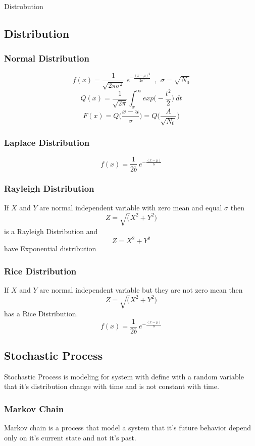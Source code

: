                 Distrobution

\subsection{Distribution}
\subsubsection{Normal Distribution}
\setlength{\abovedisplayshortskip}{7pt}
\setlength{\belowdisplayshortskip}{7pt}
\large$$ f(x) = \frac{1}{\sqrt{2\pi\sigma^2}} ~ e^{-\frac{(x-\mu)^2}{2\sigma^2}} ~~ , ~~ \sigma = \sqrt{N_0}$$
\normalsize
\setlength{\abovedisplayshortskip}{7pt}
\setlength{\belowdisplayshortskip}{7pt}
$$ Q(x) = \frac{1}{\sqrt{2\pi}}\int_x^\infty exp\big(-\frac{t^2}{2}\big)~dt$$
$$ F(x) = Q\big(\frac{x-u}{\sigma}\big) = Q \big(\frac{A}{\sqrt{N_0}}\big)$$


\subsubsection{Laplace Distribution}
\setlength{\abovedisplayshortskip}{7pt}
\setlength{\belowdisplayshortskip}{7pt}
\large$$ f(x) = \frac{1}{2 b} ~ e^{-\frac{(x-\mu)}{b}}$$


\subsubsection{Rayleigh Distribution}
If $X$ and $Y$ are normal independent variable with zero mean and equal $\sigma$ then
$$ Z = \sqrt(X^2+Y^2) $$ is a Rayleigh Distribution and $$ Z = X^2+Y^2 $$ have Exponential distribution


\subsubsection{Rice Distribution}
If $X$ and $Y$ are normal independent variable but they are not zero mean then 
$$ Z = \sqrt(X^2+Y^2) $$ has a Rice Distribution.
\setlength{\abovedisplayshortskip}{7pt}
\setlength{\belowdisplayshortskip}{7pt}
\large$$ f(x) = \frac{1}{2 b} ~ e^{-\frac{(x-\mu)}{b}}$$

\subsection{Stochastic Process}
Stochastic Process is modeling for system with define with a random variable that it's distribution change with time and is not constant with time.

\subsubsection{Markov Chain}
Markov chain is a process that model a system that it's future behavior depend only on it's current state and not it's past.
